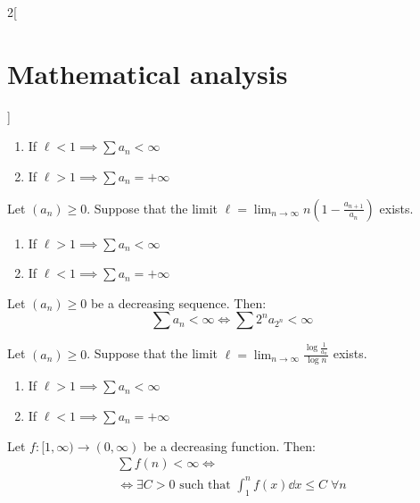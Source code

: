 \documentclass[../../../main_math.tex]{subfiles}
\begin{document}
\begin{multicols}{2}[\section{Mathematical analysis}]
\begin{theorem}
    \begin{enumerate}
      \item If $\ell<1\implies\sum a_n<\infty$
      \item If $\ell>1\implies\sum a_n=+\infty$
    \end{enumerate}
  \end{theorem}
  \begin{theorem}
    Let $(a_n)\geq 0$. Suppose that the limit $\displaystyle \ell=\lim_{n\to\infty}n\left(1-\frac{a_{n+1}}{a_n}\right)$ exists.
    \begin{enumerate}
      \item If $\ell>1\implies\sum a_n<\infty$
      \item If $\ell<1\implies\sum a_n=+\infty$
    \end{enumerate}
  \end{theorem}
  \begin{theorem}
    Let $(a_n)\geq 0$ be a decreasing sequence. Then: $$\textstyle\sum a_n<\infty\iff\sum 2^na_{2^n}<\infty$$
  \end{theorem}
  \begin{theorem}
    Let $(a_n)\geq 0$. Suppose that the limit $\displaystyle \ell=\lim_{n\to\infty}\frac{\log\frac{1}{a_n}}{\log n}$ exists.
    \begin{enumerate}
      \item If $\ell>1\implies\sum a_n<\infty$
      \item If $\ell<1\implies\sum a_n=+\infty$
    \end{enumerate}
  \end{theorem}
  \begin{theorem}\label{MA:inttest}
    Let $f:[1,\infty)\rightarrow(0,\infty)$ be a decreasing function. Then:
    \begin{multline*}
      \textstyle\sum f(n)<\infty\iff\\ \displaystyle\iff\exists C>0\text{ such that }\int_1^nf(x)\dd{x}\leq C\;\forall n
    \end{multline*}
  \end{theorem}

\end{multicols}
\end{document}
